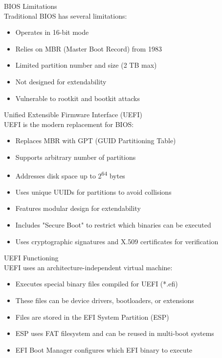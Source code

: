 \begin{definition}{BIOS Limitations}\\
    Traditional BIOS has several limitations:
    \begin{itemize}
        \item Operates in 16-bit mode
        \item Relies on MBR (Master Boot Record) from 1983
        \item Limited partition number and size (2 TB max)
        \item Not designed for extendability
        \item Vulnerable to rootkit and bootkit attacks
    \end{itemize}
\end{definition}

\begin{definition}{Unified Extensible Firmware Interface (UEFI)}\\
    UEFI is the modern replacement for BIOS:
    \begin{itemize}
        \item Replaces MBR with GPT (GUID Partitioning Table)
        \item Supports arbitrary number of partitions
        \item Addresses disk space up to 2\textsuperscript{64} bytes
        \item Uses unique UUIDs for partitions to avoid collisions
        \item Features modular design for extendability
        \item Includes "Secure Boot" to restrict which binaries can be executed
        \item Uses cryptographic signatures and X.509 certificates for verification
    \end{itemize}
\end{definition}

\begin{definition}{UEFI Functioning}\\
    UEFI uses an architecture-independent virtual machine:
    \begin{itemize}
        \item Executes special binary files compiled for UEFI (*.efi)
        \item These files can be device drivers, bootloaders, or extensions
        \item Files are stored in the EFI System Partition (ESP)
        \item ESP uses FAT filesystem and can be reused in multi-boot systems
        \item EFI Boot Manager configures which EFI binary to execute
    \end{itemize}
\end{definition}

